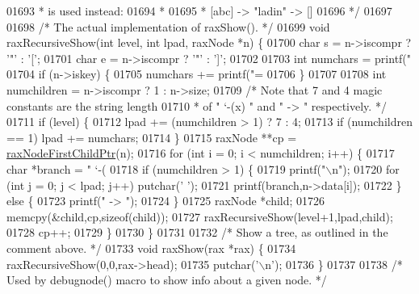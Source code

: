 \begin{DoxyCode}
{{{{{{{{{{{{{{{{{{{{{{{{01693 \textcolor{comment}{ *  is used instead:}
01694 \textcolor{comment}{ *}
01695 \textcolor{comment}{ *  [abc] -> "ladin" -> []}
01696 \textcolor{comment}{ */}
01697 
01698 \textcolor{comment}{/* The actual implementation of raxShow(). */}
01699 \textcolor{keywordtype}{void} raxRecursiveShow(\textcolor{keywordtype}{int} level, \textcolor{keywordtype}{int} lpad, raxNode *n) \{
01700     \textcolor{keywordtype}{char} s = n->iscompr ? \textcolor{stringliteral}{'"'} : \textcolor{stringliteral}{'['};
01701     \textcolor{keywordtype}{char} e = n->iscompr ? \textcolor{stringliteral}{'"'} : \textcolor{stringliteral}{']'};
01702 
01703     \textcolor{keywordtype}{int} numchars = printf(\textcolor{stringliteral}{"%
01704     \textcolor{keywordflow}{if} (n->iskey) \{
01705         numchars += printf(\textcolor{stringliteral}{"=%
01706     \}
01707 
01708     \textcolor{keywordtype}{int} numchildren = n->iscompr ? 1 : n->size;
01709     \textcolor{comment}{/* Note that 7 and 4 magic constants are the string length}
01710 \textcolor{comment}{     * of " `-(x) " and " -> " respectively. */}
01711     \textcolor{keywordflow}{if} (level) \{
01712         lpad += (numchildren > 1) ? 7 : 4;
01713         \textcolor{keywordflow}{if} (numchildren == 1) lpad += numchars;
01714     \}
01715     raxNode **cp = \hyperlink{rax_8c_aa94163a0d02b30219ef18e5a3ea06ca6}{raxNodeFirstChildPtr}(n);
01716     \textcolor{keywordflow}{for} (\textcolor{keywordtype}{int} i = 0; i < numchildren; i++) \{
01717         \textcolor{keywordtype}{char} *branch = \textcolor{stringliteral}{" `-(%
01718         \textcolor{keywordflow}{if} (numchildren > 1) \{
01719             printf(\textcolor{stringliteral}{"\(\backslash\)n"});
01720             \textcolor{keywordflow}{for} (\textcolor{keywordtype}{int} j = 0; j < lpad; j++) putchar(\textcolor{stringliteral}{' '});
01721             printf(branch,n->data[i]);
01722         \} \textcolor{keywordflow}{else} \{
01723             printf(\textcolor{stringliteral}{" -> "});
01724         \}
01725         raxNode *child;
01726         memcpy(&child,cp,\textcolor{keyword}{sizeof}(child));
01727         raxRecursiveShow(level+1,lpad,child);
01728         cp++;
01729     \}
01730 \}
01731 
01732 \textcolor{comment}{/* Show a tree, as outlined in the comment above. */}
01733 \textcolor{keywordtype}{void} raxShow(rax *rax) \{
01734     raxRecursiveShow(0,0,rax->head);
01735     putchar(\textcolor{stringliteral}{'\(\backslash\)n'});
01736 \}
01737 
01738 \textcolor{comment}{/* Used by debugnode() macro to show info about a given node. */}
}}}}}}}}}}}}}}}}}}}}}}}}}}}
\end{DoxyCode}
